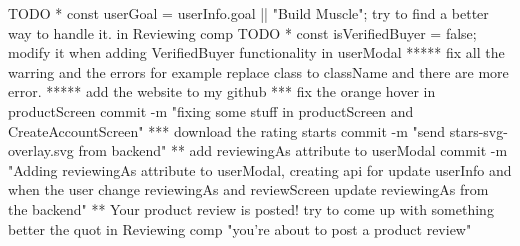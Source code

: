 {TODO * const userGoal = userInfo.goal || "Build Muscle"; try to find a better way to handle it. in Reviewing comp
TODO * const isVerifiedBuyer = false; modify it when adding VerifiedBuyer functionality in userModal
***** fix all the warring and the errors for example replace class to className and there are more error.
***** add the website to my github
 *** fix the orange hover in productScreen
    commit -m "fixing some stuff in productScreen and CreateAccountScreen"
*** download the rating starts
    commit -m "send stars-svg-overlay.svg from backend"
** add reviewingAs attribute to userModal
    commit -m "Adding reviewingAs attribute to userModal, creating api for update userInfo and when the user change reviewingAs and reviewScreen update reviewingAs from the backend"
** Your product review is posted!  try to come up with something better the quot in Reviewing comp 
        "you're about to post a product review"

}
